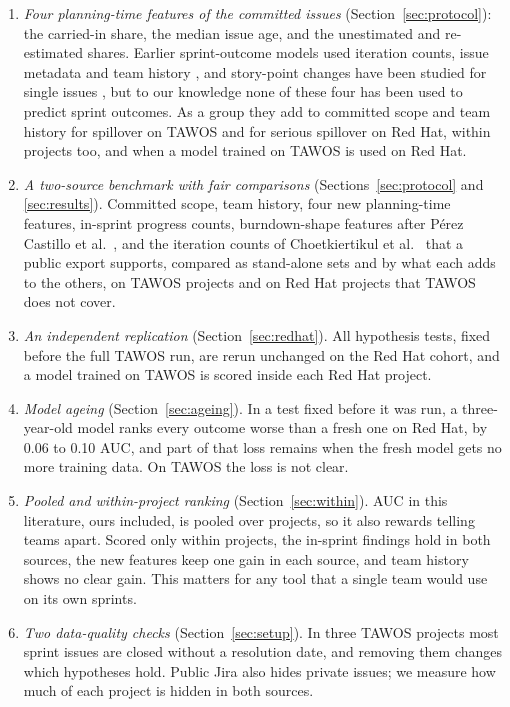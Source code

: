 \documentclass[journal]{IEEEtran}
\begin{document}
\begin{enumerate}
\item \emph{Four planning-time features of the committed issues} (Section~\ref{sec:protocol}): the carried-in share, the median issue age, and the unestimated and re-estimated shares. Earlier sprint-outcome models used iteration counts, issue metadata and team history \cite{choet2018,kula2021}, and story-point changes have been studied for single issues \cite{pasuksmit2022}, but to our knowledge none of these four has been used to predict sprint outcomes. As a group they add to committed scope and team history for spillover on TAWOS and for serious spillover on Red Hat, within projects too, and when a model trained on TAWOS is used on Red Hat.
\item \emph{A two-source benchmark with fair comparisons} (Sections~\ref{sec:protocol} and \ref{sec:results}). Committed scope, team history, four new planning-time features, in-sprint progress counts, burndown-shape features after P\'erez Castillo et al.\ \cite{perez2024}, and the iteration counts of Choetkiertikul et al.\ \cite{choet2018} that a public export supports, compared as stand-alone sets and by what each adds to the others, on \NProj{} TAWOS projects and on \RHProj{} Red Hat projects that TAWOS does not cover.
\item \emph{An independent replication} (Section~\ref{sec:redhat}). All \NHyp{} hypothesis tests, fixed before the full TAWOS run, are rerun unchanged on the Red Hat cohort, and a model trained on TAWOS is scored inside each Red Hat project.
\item \emph{Model ageing} (Section~\ref{sec:ageing}). In a test fixed before it was run, a three-year-old model ranks every outcome worse than a fresh one on Red Hat, by 0.06 to 0.10 AUC, and part of that loss remains when the fresh model gets no more training data. On TAWOS the loss is not clear.
\item \emph{Pooled and within-project ranking} (Section~\ref{sec:within}). AUC in this literature, ours included, is pooled over projects, so it also rewards telling teams apart. Scored only within projects, the in-sprint findings hold in both sources, the new features keep one gain in each source, and team history shows no clear gain. This matters for any tool that a single team would use on its own sprints.
\item \emph{Two data-quality checks} (Section~\ref{sec:setup}). In three TAWOS projects most sprint issues are closed without a resolution date, and removing them changes which hypotheses hold. Public Jira also hides private issues; we measure how much of each project is hidden in both sources.

\end{enumerate}
\end{document}
